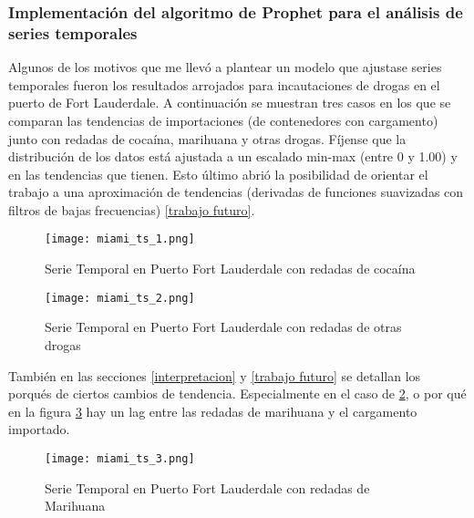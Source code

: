 \documentclass[12pt]{article}
\begin{document}
	
	
	\subsubsection{Implementación del algoritmo de Prophet para el análisis de series temporales}
	Algunos de los motivos que me llevó a plantear un modelo que ajustase series temporales fueron los resultados arrojados para incautaciones de drogas en el puerto de Fort Lauderdale. A continuación se muestran tres casos en los que se comparan las tendencias de importaciones (de contenedores con cargamento) junto con redadas de cocaína, marihuana y otras drogas. Fíjense que la distribución de los datos está ajustada a un escalado min-max (entre 0 y 1.00) y en las tendencias que tienen. Esto último abrió la posibilidad de orientar el trabajo a una aproximación de tendencias (derivadas de funciones suavizadas con filtros de bajas frecuencias) \ref{trabajo futuro}.
	
	\begin{figure}[H]
		\caption{\label{miami_ts_1} Serie Temporal en Puerto Fort Lauderdale con redadas de cocaína}
		\centering
		\hspace*{1cm}
		\texttt{[image: miami\_ts\_1.png]}
	\end{figure}

	\begin{figure}[H]
		\caption{\label{miami_ts_2} Serie Temporal en Puerto Fort Lauderdale con redadas de otras drogas}
		\centering
		\hspace*{1cm}
		\texttt{[image: miami\_ts\_2.png]}
	\end{figure}

	También en las secciones \ref{interpretacion} y \ref{trabajo futuro} se detallan los porqués de ciertos cambios de tendencia. Especialmente en el caso de \ref{miami_ts_2}, o por qué en la figura \ref{miami_ts_3} hay un lag entre las redadas de marihuana y el cargamento importado.
	
	\begin{figure}[H]
		\caption{\label{miami_ts_3} Serie Temporal en Puerto Fort Lauderdale con redadas de Marihuana}
		\centering
		\hspace*{1cm}
		\texttt{[image: miami\_ts\_3.png]}
	\end{figure}
	
\end{document}
